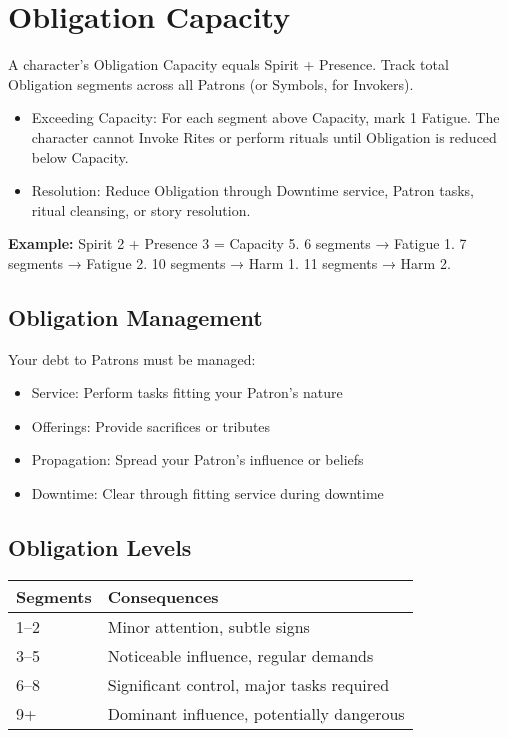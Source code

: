 \documentclass[11pt,twoside,openany]{book}
\begin{document}
\section*{Obligation Capacity} 

A character's Obligation Capacity equals Spirit + Presence. Track total Obligation segments across all Patrons (or Symbols, for Invokers).

\begin{itemize}
\item Exceeding Capacity: For each segment above Capacity, mark 1 Fatigue. The character cannot Invoke Rites or perform rituals until Obligation is reduced below Capacity.
\item Resolution: Reduce Obligation through Downtime service, Patron tasks, ritual cleansing, or story resolution.
\end{itemize}

\textbf{Example:} Spirit 2 + Presence 3 = Capacity 5. 6 segments → Fatigue 1. 7 segments → Fatigue 2. 10 segments → Harm 1. 11 segments → Harm 2.

\subsection*{Obligation Management}

Your debt to Patrons must be managed:
\begin{itemize}
\item Service: Perform tasks fitting your Patron's nature
\item Offerings: Provide sacrifices or tributes
\item Propagation: Spread your Patron's influence or beliefs
\item Downtime: Clear through fitting service during downtime
\end{itemize}

\subsection*{Obligation Levels}

\begin{center}
\begin{tabular}{|l|l|}
\hline
\textbf{Segments} & \textbf{Consequences} \\
\hline
1–2 & Minor attention, subtle signs \\
3–5 & Noticeable influence, regular demands \\
6–8 & Significant control, major tasks required \\
9+ & Dominant influence, potentially dangerous \\
\hline
\end{tabular}
\end{center}
\end{document}
